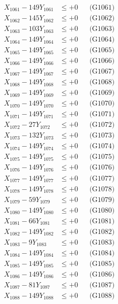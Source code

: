 \documentclass[a4paper,10pt]{article}
\begin{document}
{\begin{align}
\allowbreak
X_{1061} - 149Y_{1061} &\leq +0 && \text{(G1061)} \\
X_{1062} - 145Y_{1062} &\leq +0 && \text{(G1062)} \\
X_{1063} - 103Y_{1063} &\leq +0 && \text{(G1063)} \\
X_{1064} - 149Y_{1064} &\leq +0 && \text{(G1064)} \\
X_{1065} - 149Y_{1065} &\leq +0 && \text{(G1065)} \\
X_{1066} - 149Y_{1066} &\leq +0 && \text{(G1066)} \\
X_{1067} - 149Y_{1067} &\leq +0 && \text{(G1067)} \\
X_{1068} - 149Y_{1068} &\leq +0 && \text{(G1068)} \\
X_{1069} - 149Y_{1069} &\leq +0 && \text{(G1069)} \\
X_{1070} - 149Y_{1070} &\leq +0 && \text{(G1070)} \\
\allowbreak
X_{1071} - 149Y_{1071} &\leq +0 && \text{(G1071)} \\
X_{1072} - 27Y_{1072} &\leq +0 && \text{(G1072)} \\
X_{1073} - 132Y_{1073} &\leq +0 && \text{(G1073)} \\
X_{1074} - 149Y_{1074} &\leq +0 && \text{(G1074)} \\
X_{1075} - 149Y_{1075} &\leq +0 && \text{(G1075)} \\
X_{1076} - 149Y_{1076} &\leq +0 && \text{(G1076)} \\
X_{1077} - 149Y_{1077} &\leq +0 && \text{(G1077)} \\
X_{1078} - 149Y_{1078} &\leq +0 && \text{(G1078)} \\
X_{1079} - 59Y_{1079} &\leq +0 && \text{(G1079)} \\
X_{1080} - 149Y_{1080} &\leq +0 && \text{(G1080)} \\
\allowbreak
X_{1081} - 66Y_{1081} &\leq +0 && \text{(G1081)} \\
X_{1082} - 149Y_{1082} &\leq +0 && \text{(G1082)} \\
X_{1083} - 9Y_{1083} &\leq +0 && \text{(G1083)} \\
X_{1084} - 149Y_{1084} &\leq +0 && \text{(G1084)} \\
X_{1085} - 149Y_{1085} &\leq +0 && \text{(G1085)} \\
X_{1086} - 149Y_{1086} &\leq +0 && \text{(G1086)} \\
X_{1087} - 81Y_{1087} &\leq +0 && \text{(G1087)} \\
X_{1088} - 149Y_{1088} &\leq +0 && \text{(G1088)} \\

\end{align}}
\end{document}
